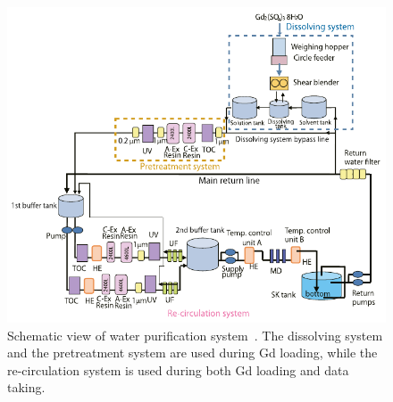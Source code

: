 \begin{figure}[H]
	\centering
	\includegraphics[width=14cm]{Figures/SK/Water}
	\caption[Schematic view of water purification system]{
	Schematic view of water purification system~\cite{2022Abe}.
	The dissolving system and the pretreatment system are used during Gd loading, while the re-circulation system is used during both Gd loading and data taking.
	}\label{SK_Water}
\end{figure}





